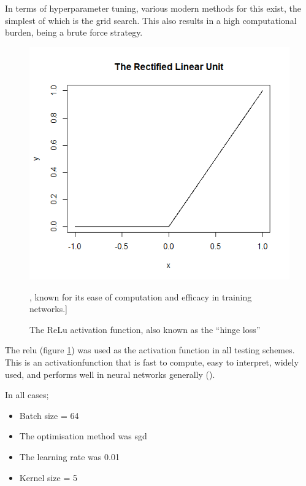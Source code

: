 In terms of \gls{hyperparameter} tuning, various modern methods for this exist, the simplest of which is the grid search. This also results in a high computational burden, being a brute force strategy. 
\bigskip

\begin{figure}
    \centering
    \includegraphics[scale=0.5]{figs/relu.png}
    \caption[The ReLu activation function.]{The ReLu activation function, also known as the \enquote{hinge loss}}, known for its ease of computation and efficacy in training networks.]
    \label{fig:relu_function}
\end{figure}

The \gls{relu} (figure \ref{fig:relu_function}) was used as the activation function in all testing schemes. This is an \gls{activationfunction} that is fast to compute, easy to interpret, widely used, and performs well in neural networks generally (\cite{activation_search}). 
\bigskip

In all cases;

\begin{itemize}
    \itemsep-1em 
    \item Batch size = 64
    \item The optimisation method was \gls{sgd}
    \item The learning rate was 0.01
    \item Kernel size = 5
\end{itemize}

